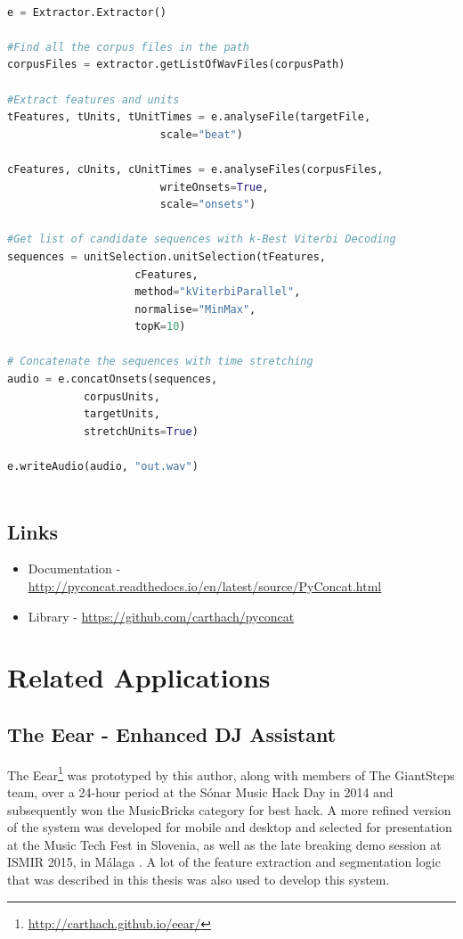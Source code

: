 \small
\begin{lstlisting}[language=Python]

e = Extractor.Extractor()

#Find all the corpus files in the path
corpusFiles = extractor.getListOfWavFiles(corpusPath)

#Extract features and units
tFeatures, tUnits, tUnitTimes = e.analyseFile(targetFile, 
						scale="beat")
						
cFeatures, cUnits, cUnitTimes = e.analyseFiles(corpusFiles, 
						writeOnsets=True, 
						scale="onsets")

#Get list of candidate sequences with k-Best Viterbi Decoding 
sequences = unitSelection.unitSelection(tFeatures, 
					cFeatures, 
					method="kViterbiParallel", 
					normalise="MinMax", 
					topK=10)

# Concatenate the sequences with time stretching
audio = e.concatOnsets(sequences, 
			corpusUnits, 
			targetUnits, 
			stretchUnits=True)	
							   
e.writeAudio(audio, "out.wav")
 
\end{lstlisting}

\normalsize

\section{Links}

\begin{itemize}
  \item Documentation - \url{http://pyconcat.readthedocs.io/en/latest/source/PyConcat.html}
  \item Library - \url{https://github.com/carthach/pyconcat}
\end{itemize}

\chapter{Related Applications}
\label{app:related_applications}

\section{The Eear - Enhanced DJ Assistant}

The Eear\footnote{\url{http://carthach.github.io/eear/}} was prototyped by this author, along with members of The GiantSteps team, over a 24-hour period at the Sónar Music Hack Day in 2014 and subsequently won the MusicBricks category for best hack. A more refined version of the system was developed for mobile and desktop and selected for presentation at the Music Tech Fest in Slovenia, as well as the late breaking demo session at ISMIR 2015, in Málaga \citep{ONuanain2015}. A lot of the feature extraction and segmentation logic that was described in this thesis was also used to develop this system.

